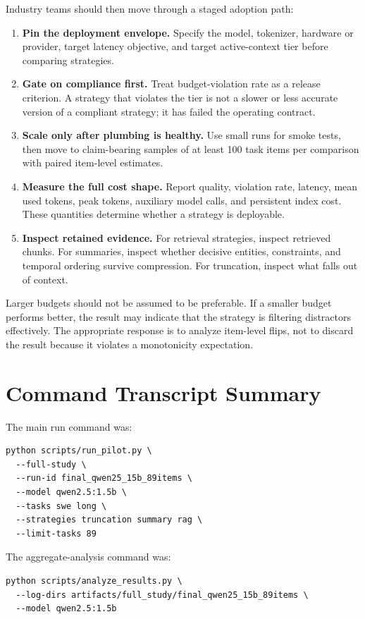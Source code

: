 \documentclass[11pt]{article}
\begin{document}
Industry teams should then move through a staged adoption path:
\begin{enumerate}[leftmargin=*]
  \item \textbf{Pin the deployment envelope.}  Specify the model, tokenizer,
  hardware or provider, target latency objective, and target active-context
  tier before comparing strategies.
  \item \textbf{Gate on compliance first.}  Treat budget-violation rate as a
  release criterion.  A strategy that violates the tier is not a slower or less
  accurate version of a compliant strategy; it has failed the operating
  contract.
  \item \textbf{Scale only after plumbing is healthy.}  Use small runs for
  smoke tests, then move to claim-bearing samples of at least 100 task items
  per comparison with paired item-level estimates.
  \item \textbf{Measure the full cost shape.}  Report quality, violation rate,
  latency, mean used tokens, peak tokens, auxiliary model calls, and persistent
  index cost.  These quantities determine whether a strategy is deployable.
  \item \textbf{Inspect retained evidence.}  For retrieval strategies, inspect
  retrieved chunks.  For summaries, inspect whether decisive entities,
  constraints, and temporal ordering survive compression.  For truncation,
  inspect what falls out of context.
\end{enumerate}

Larger budgets should not be assumed to be preferable.  If a smaller budget
performs better, the result may indicate that the strategy is filtering
distractors effectively.  The appropriate response is to analyze item-level
flips, not to discard the result because it violates a monotonicity
expectation.

\section{Command Transcript Summary}

The main run command was:
\begin{verbatim}
python scripts/run_pilot.py \
  --full-study \
  --run-id final_qwen25_15b_89items \
  --model qwen2.5:1.5b \
  --tasks swe long \
  --strategies truncation summary rag \
  --limit-tasks 89
\end{verbatim}

The aggregate-analysis command was:
\begin{verbatim}
python scripts/analyze_results.py \
  --log-dirs artifacts/full_study/final_qwen25_15b_89items \
  --model qwen2.5:1.5b
\end{verbatim}
\end{document}
